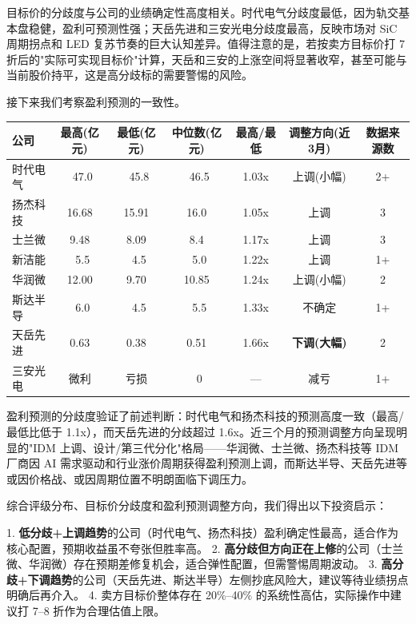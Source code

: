 目标价的分歧度与公司的业绩确定性高度相关。时代电气分歧度最低，因为轨交基本盘稳健，盈利可预测性强；天岳先进和三安光电分歧度最高，反映市场对 SiC 周期拐点和 LED 复苏节奏的巨大认知差异。值得注意的是，若按卖方目标价打 7 折后的"实际可实现目标价"计算，天岳和三安的上涨空间将显著收窄，甚至可能与当前股价持平，这是高分歧标的需要警惕的风险。

接下来我们考察盈利预测的一致性。

\begin{exhibitbox}[表 7-5：2026E 盈利预测对比与机构分歧]
\centering
\small
\begin{tabularx}{\textwidth}{X c c c c c c}
\toprule
\textbf{公司} & \textbf{最高(亿元)} & \textbf{最低(亿元)} & \textbf{中位数(亿元)} & \textbf{最高/最低} & \textbf{调整方向(近3月)} & \textbf{数据来源数} \\
\midrule
\rowcolor{riskgreen!10}
时代电气 & ~47.0 & ~45.8 & ~46.5 & 1.03x & 上调(小幅) & 2+ \\
\rowcolor{riskgreen!10}
扬杰科技 & 16.68 & 15.91 & 16.0 & 1.05x & 上调 & 3 \\
\rowcolor{riskamber!10}
士兰微 & 9.48 & 8.09 & 8.4 & 1.17x & 上调 & 3 \\
\rowcolor{riskamber!10}
新洁能 & ~5.5 & ~4.5 & ~5.0 & 1.22x & 上调 & 1+ \\
\rowcolor{riskamber!10}
华润微 & 12.00 & 9.70 & 10.85 & 1.24x & 上调(小幅) & 2 \\
\rowcolor{riskamber!10}
斯达半导 & ~6.0 & ~4.5 & ~5.5 & 1.33x & 不确定 & 1+ \\
\rowcolor{riskred!10}
天岳先进 & 0.63 & 0.38 & 0.51 & 1.66x & \textbf{下调(大幅)} & 2 \\
\rowcolor{steelgrey!10}
三安光电 & 微利 & 亏损 & ~0 & — & 减亏 & 1+ \\
\bottomrule
\end{tabularx}
\end{exhibitbox}

盈利预测的分歧度验证了前述判断：时代电气和扬杰科技的预测高度一致（最高/最低比低于 1.1x），而天岳先进的分歧超过 1.6x。近三个月的预测调整方向呈现明显的"IDM 上调、设计/第三代分化"格局——华润微、士兰微、扬杰科技等 IDM 厂商因 AI 需求驱动和行业涨价周期获得盈利预测上调，而斯达半导、天岳先进等或因价格战、或因周期位置不明朗面临下调压力。

\begin{keyinsight}[机构预期的投资含义]
综合评级分布、目标价分歧度和盈利预测调整方向，我们得出以下投资启示：

1. \textbf{低分歧+上调趋势}的公司（时代电气、扬杰科技）盈利确定性最高，适合作为核心配置，预期收益虽不夸张但胜率高。
2. \textbf{高分歧但方向正在上修}的公司（士兰微、华润微）存在预期差修复机会，适合弹性配置，但需警惕周期波动。
3. \textbf{高分歧+下调趋势}的公司（天岳先进、斯达半导）左侧抄底风险大，建议等待业绩拐点明确后再介入。
4. 卖方目标价整体存在 20\%–40\% 的系统性高估，实际操作中建议打 7–8 折作为合理估值上限。
\end{keyinsight}


